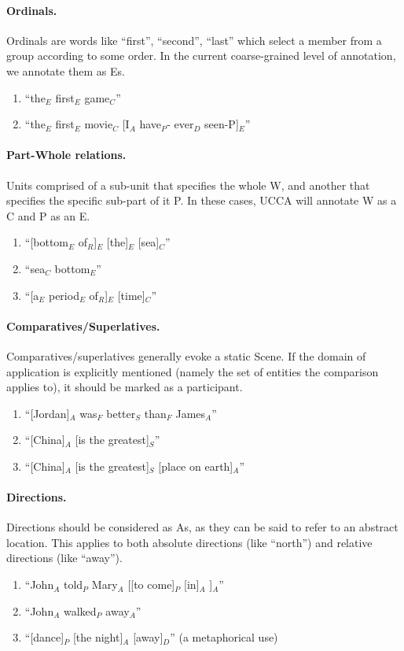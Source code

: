 \documentclass[11pt]{article}
\newcommand{\be}{\begin{enumerate}}
\newcommand{\ee}{\end{enumerate}}
\begin{document}
\paragraph{
Ordinals.} Ordinals are words like ``first'', ``second'', ``last'' which select a member from a group according to some order. In the current coarse-grained level of annotation, we annotate them as Es.
\be \item
``the$_E$ first$_E$ game$_C$''
\item
``the$_E$ first$_E$ movie$_C$ [I$_A$ have$_P$- ever$_D$ seen-P]$_E$''
\ee

\paragraph{
Part-Whole relations.} Units comprised of a sub-unit that specifies the whole W, and another that specifies the specific sub-part of it P. In these cases, UCCA will annotate W as a C and P as an E.
\be
\item
``[bottom$_E$ of$_R$]$_E$ [the]$_E$ [sea]$_C$''
\item
``sea$_C$ bottom$_E$''
\item
``[a$_E$ period$_E$ of$_R$]$_E$ [time]$_C$''
\ee

\paragraph{
Comparatives/Superlatives.} Comparatives/superlatives generally evoke a static Scene. If the domain of application is explicitly mentioned (namely the set of entities the comparison applies to), it should be marked as a participant.
\be
\item
``[Jordan]$_A$ was$_F$ better$_S$ than$_F$ James$_A$''
\item
``[China]$_A$ [is the greatest]$_S$''
\item
``[China]$_A$ [is the greatest]$_S$ [place on earth]$_A$''
\ee

\paragraph{
Directions.} Directions should be considered as As, as they can be said to refer to an abstract location. This applies to both absolute directions (like ``north'') and relative directions (like ``away'').
\be
\item
``John$_A$ told$_P$ Mary$_A$ [[to come]$_P$ [in]$_A$ ]$_A$''
\item
``John$_A$ walked$_P$ away$_A$''
\item
``[dance]$_P$ [the night]$_A$ [away]$_D$'' (a metaphorical use)
\ee
\end{document}
